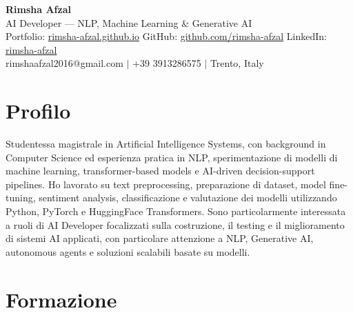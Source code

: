 \documentclass[11pt]{article}
\begin{document}

\begin{center}

{\LARGE \textbf{Rimsha Afzal}} \\[6pt]

AI Developer — NLP, Machine Learning \& Generative AI \\[6pt]

Portfolio: \href{https://rimsha-afzal.github.io}{rimsha-afzal.github.io} \quad
GitHub: \href{https://github.com/rimsha-afzal}{github.com/rimsha-afzal} \quad
LinkedIn: \href{https://www.linkedin.com/in/rimsha-afzal-b0537123b/?lipi=urn%3Ali%3Apage%3Ad_flagship3_profile_view_base_contact_details%3BTbhXtoP0RS6goeD96Ggzjg%3D%3D}{rimsha-afzal} \\[4pt]
{\color{textgray}rimshaafzal2016@gmail.com $|$ +39 3913286575 $|$ Trento, Italy}

\end{center}

\vspace{-6pt}


\section*{Profilo}

Studentessa magistrale in Artificial Intelligence Systems, con background in Computer Science ed esperienza pratica in NLP, sperimentazione di modelli di machine learning, transformer-based models e AI-driven decision-support pipelines. Ho lavorato su text preprocessing, preparazione di dataset, model fine-tuning, sentiment analysis, classificazione e valutazione dei modelli utilizzando Python, PyTorch e HuggingFace Transformers. Sono particolarmente interessata a ruoli di AI Developer focalizzati sulla costruzione, il testing e il miglioramento di sistemi AI applicati, con particolare attenzione a NLP, Generative AI, autonomous agents e soluzioni scalabili basate su modelli.


\section*{Formazione}
\end{document}
